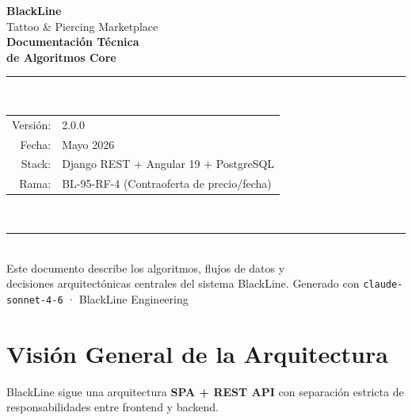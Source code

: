 \documentclass[11pt,a4paper]{article}
\begin{document}
\begin{titlepage}
  \centering
  \vspace*{3cm}
  {\fontsize{36}{44}\selectfont\bfseries\color{blkGold} BlackLine}\\[0.4cm]
  {\large\color{blkText!70} Tattoo \& Piercing Marketplace}\\[2.5cm]
  {\fontsize{22}{28}\selectfont\bfseries\color{blkText}
    Documentación Técnica\\[0.3cm]
    de Algoritmos Core}\\[1.2cm]
  \textcolor{blkGold}{\rule{0.5\textwidth}{0.8pt}}\\[1.5cm]
  {\normalsize\color{blkText!70}
    \begin{tabular}{rl}
      \textcolor{blkGold}{Versión:}    & 2.0.0\\[4pt]
      \textcolor{blkGold}{Fecha:}      & Mayo 2026\\[4pt]
      \textcolor{blkGold}{Stack:}      & Django REST + Angular 19 + PostgreSQL\\[4pt]
      \textcolor{blkGold}{Rama:}       & BL-95-RF-4 (Contraoferta de precio/fecha)\\
    \end{tabular}
  }\\[2.5cm]
  \textcolor{blkGold}{\rule{0.5\textwidth}{0.8pt}}\\[1cm]
  {\small\color{blkText!50}
    Este documento describe los algoritmos, flujos de datos y\\
    decisiones arquitectónicas centrales del sistema BlackLine.
  }
  \vfill
  {\footnotesize\color{blkText!40} Generado con \texttt{claude-sonnet-4-6} · BlackLine Engineering}
\end{titlepage}

\tableofcontents
\clearpage

\section{Visión General de la Arquitectura}

BlackLine sigue una arquitectura \textbf{SPA + REST API} con separación estricta de
responsabilidades entre frontend y backend.
\end{document}
